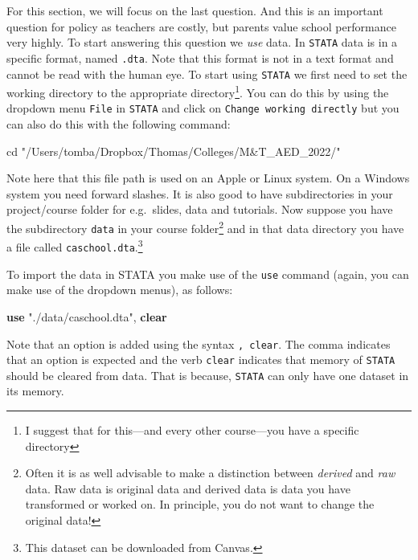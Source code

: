 \documentclass[
]{book}
\newenvironment{Shaded}{\begin{snugshade}}{\end{snugshade}}
\newcommand{\KeywordTok}[1]{\textcolor[rgb]{0.13,0.29,0.53}{\textbf{#1}}}
\newcommand{\NormalTok}[1]{#1}
\newcommand{\StringTok}[1]{\textcolor[rgb]{0.31,0.60,0.02}{#1}}
\begin{document}
For this section, we will focus on the last question. And this is an important question for policy as teachers are costly, but parents value school performance very highly. To start answering this question we \emph{use} data. In \texttt{STATA} data is in a specific format, named \texttt{.dta}. Note that this format is not in a text format and cannot be read with the human eye. To start using \texttt{STATA} we first need to set the working directory to the appropriate directory\footnote{I suggest that for this---and every other course---you have a specific directory}. You can do this by using the dropdown menu \texttt{File} in \texttt{STATA} and click on \texttt{Change\ working\ directly} but you can also do this with the following command:

\begin{Shaded}
\begin{Highlighting}[]
\NormalTok{cd  }\StringTok{"/Users/tomba/Dropbox/Thomas/Colleges/M\&T\_AED\_2022/"}
\end{Highlighting}
\end{Shaded}

Note here that this file path is used on an Apple or Linux system. On a Windows system you need forward slashes. It is also good to have subdirectories in your project/course folder for e.g.~slides, data and tutorials. Now suppose you have the subdirectory \texttt{data} in your course folder\footnote{Often it is as well advisable to make a distinction between \emph{derived} and \emph{raw} data. Raw data is original data and derived data is data you have transformed or worked on. In principle, you do not want to change the original data!} and in that data directory you have a file called \texttt{caschool.dta}.\footnote{This dataset can be downloaded from Canvas.}

To import the data in STATA you make use of the \texttt{use} command (again, you can make use of the dropdown menus), as follows:

\begin{Shaded}
\begin{Highlighting}[]
\KeywordTok{use} \StringTok{"./data/caschool.dta"}\NormalTok{, }\KeywordTok{clear}
\end{Highlighting}
\end{Shaded}

Note that an option is added using the syntax \texttt{,\ clear}. The comma indicates that an option is expected and the verb \texttt{clear} indicates that memory of \texttt{STATA} should be cleared from data. That is because, \texttt{STATA} can only have one dataset in its memory.
\end{document}
